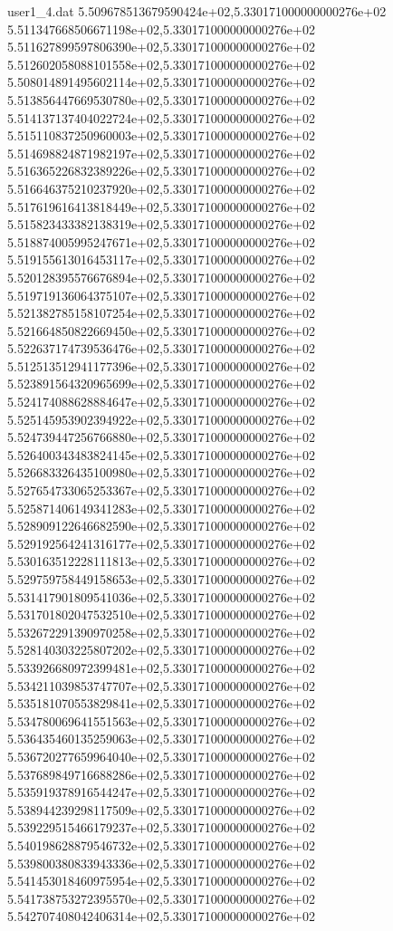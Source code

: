 \begin{filecontents}{user1_4.dat}
5.509678513679590424e+02,5.330171000000000276e+02
5.511347668506671198e+02,5.330171000000000276e+02
5.511627899597806390e+02,5.330171000000000276e+02
5.512602058088101558e+02,5.330171000000000276e+02
5.508014891495602114e+02,5.330171000000000276e+02
5.513856447669530780e+02,5.330171000000000276e+02
5.514137137404022724e+02,5.330171000000000276e+02
5.515110837250960003e+02,5.330171000000000276e+02
5.514698824871982197e+02,5.330171000000000276e+02
5.516365226832389226e+02,5.330171000000000276e+02
5.516646375210237920e+02,5.330171000000000276e+02
5.517619616413818449e+02,5.330171000000000276e+02
5.515823433382138319e+02,5.330171000000000276e+02
5.518874005995247671e+02,5.330171000000000276e+02
5.519155613016453117e+02,5.330171000000000276e+02
5.520128395576676894e+02,5.330171000000000276e+02
5.519719136064375107e+02,5.330171000000000276e+02
5.521382785158107254e+02,5.330171000000000276e+02
5.521664850822669450e+02,5.330171000000000276e+02
5.522637174739536476e+02,5.330171000000000276e+02
5.512513512941177396e+02,5.330171000000000276e+02
5.523891564320965699e+02,5.330171000000000276e+02
5.524174088628884647e+02,5.330171000000000276e+02
5.525145953902394922e+02,5.330171000000000276e+02
5.524739447256766880e+02,5.330171000000000276e+02
5.526400343483824145e+02,5.330171000000000276e+02
5.526683326435100980e+02,5.330171000000000276e+02
5.527654733065253367e+02,5.330171000000000276e+02
5.525871406149341283e+02,5.330171000000000276e+02
5.528909122646682590e+02,5.330171000000000276e+02
5.529192564241316177e+02,5.330171000000000276e+02
5.530163512228111813e+02,5.330171000000000276e+02
5.529759758449158653e+02,5.330171000000000276e+02
5.531417901809541036e+02,5.330171000000000276e+02
5.531701802047532510e+02,5.330171000000000276e+02
5.532672291390970258e+02,5.330171000000000276e+02
5.528140303225807202e+02,5.330171000000000276e+02
5.533926680972399481e+02,5.330171000000000276e+02
5.534211039853747707e+02,5.330171000000000276e+02
5.535181070553829841e+02,5.330171000000000276e+02
5.534780069641551563e+02,5.330171000000000276e+02
5.536435460135259063e+02,5.330171000000000276e+02
5.536720277659964040e+02,5.330171000000000276e+02
5.537689849716688286e+02,5.330171000000000276e+02
5.535919378916544247e+02,5.330171000000000276e+02
5.538944239298117509e+02,5.330171000000000276e+02
5.539229515466179237e+02,5.330171000000000276e+02
5.540198628879546732e+02,5.330171000000000276e+02
5.539800380833943336e+02,5.330171000000000276e+02
5.541453018460975954e+02,5.330171000000000276e+02
5.541738753272395570e+02,5.330171000000000276e+02
5.542707408042406314e+02,5.330171000000000276e+02

\end{filecontents}
